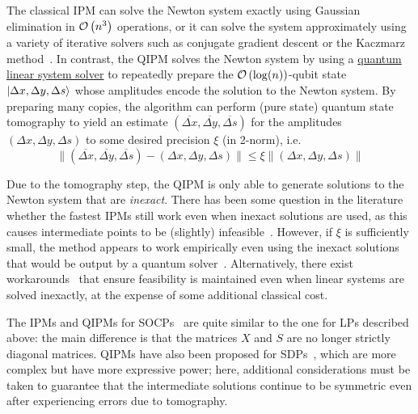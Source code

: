 \begin{refsection}
The classical IPM can solve the Newton system exactly using Gaussian elimination in $\mathcal{O}\left( n^3 \right)$ operations, or it can solve the system approximately using a variety of iterative solvers such as conjugate gradient descent or the Kaczmarz method~\cite{strohmer2009kaczmarz}. In contrast, the QIPM solves the Newton system by using a \hyperref[prim:QuantumLinearSystemSolvers]{quantum linear system solver} to repeatedly prepare the $\mathcal{O}\left( \log(n) \right)$-qubit state $\lvert\Delta x, \Delta y, \Delta s\rangle$ whose amplitudes encode the solution to the Newton system. 
By preparing many copies, the algorithm can perform (pure state) quantum state tomography to yield an estimate $(\overline{\Delta x}, \overline{\Delta y}, \overline{\Delta s})$ for the amplitudes $(\Delta x, \Delta y, \Delta s)$ to some desired precision $\xi$ (in 2-norm), i.e.
\begin{equation}
    \lVert (\overline{\Delta x}, \overline{\Delta y}, \overline{\Delta s})-(\Delta x, \Delta y, \Delta s) \rVert \leq \xi \lVert (\Delta x, \Delta y, \Delta s) \rVert 
\end{equation}

Due to the tomography step, the QIPM is only able to generate solutions to the Newton system that are \emph{inexact}. There has been some question in the literature whether the fastest IPMs still work even when inexact solutions are used, as this causes intermediate points to be (slightly) infeasible~\cite{augustino2021quantum}. However, if $\xi$ is sufficiently small, the method appears to work empirically even using the inexact solutions that would be output by a quantum solver~\cite{dalzell2022socp}. Alternatively, there exist workarounds~\cite{augustino2021quantum} that ensure feasibility is maintained even when linear systems are solved inexactly, at the expense of some additional classical cost.

The IPMs and QIPMs for SOCPs~\cite{kerenidis2019QAlgsSecondOrderConeSVM,augustino2022inexact} are quite similar to the one for LPs described above: the main difference is that the matrices $X$ and $S$ are no longer strictly diagonal matrices. QIPMs have also been proposed for SDPs~\cite{kerenidis2018QIntPoint,augustino2021quantum,huang2022fasterQuantumIPM}, which are more complex but have more expressive power; here, additional considerations must be taken to guarantee that the intermediate solutions continue to be symmetric even after experiencing errors due to tomography. 



\end{refsection}
